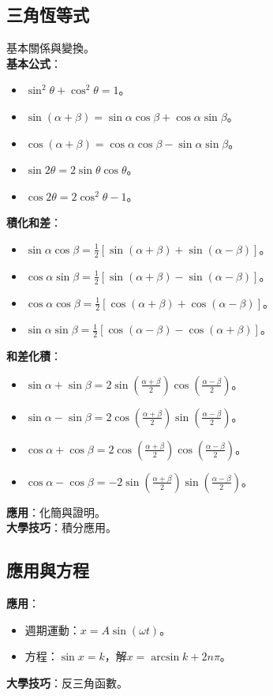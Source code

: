 \subsection{三角恆等式}
基本關係與變換。\\
\textbf{基本公式}：
\begin{itemize}
    \item $\sin^2 \theta + \cos^2 \theta = 1$。
    \item $\sin(\alpha + \beta) = \sin \alpha \cos \beta + \cos \alpha \sin \beta$。
    \item $\cos(\alpha + \beta) = \cos \alpha \cos \beta - \sin \alpha \sin \beta$。
    \item $\sin 2\theta = 2 \sin \theta \cos \theta$。
    \item $\cos 2\theta = 2\cos^2 \theta - 1$。
\end{itemize}
\textbf{積化和差}：
\begin{itemize}
    \item $\sin \alpha \cos \beta = \frac{1}{2} [\sin(\alpha + \beta) + \sin(\alpha - \beta)]$。
    \item $\cos \alpha \sin \beta = \frac{1}{2} [\sin(\alpha + \beta) - \sin(\alpha - \beta)]$。
    \item $\cos \alpha \cos \beta = \frac{1}{2} [\cos(\alpha + \beta) + \cos(\alpha - \beta)]$。
    \item $\sin \alpha \sin \beta = \frac{1}{2} [\cos(\alpha - \beta) - \cos(\alpha + \beta)]$。
\end{itemize}
\textbf{和差化積}：
\begin{itemize}
    \item $\sin \alpha + \sin \beta = 2 \sin\left(\frac{\alpha + \beta}{2}\right) \cos\left(\frac{\alpha - \beta}{2}\right)$。
    \item $\sin \alpha - \sin \beta = 2 \cos\left(\frac{\alpha + \beta}{2}\right) \sin\left(\frac{\alpha - \beta}{2}\right)$。
    \item $\cos \alpha + \cos \beta = 2 \cos\left(\frac{\alpha + \beta}{2}\right) \cos\left(\frac{\alpha - \beta}{2}\right)$。
    \item $\cos \alpha - \cos \beta = -2 \sin\left(\frac{\alpha + \beta}{2}\right) \sin\left(\frac{\alpha - \beta}{2}\right)$。
\end{itemize}
\textbf{應用}：化簡與證明。\\
\textbf{大學技巧}：積分應用。

\subsection{應用與方程}
\textbf{應用}：
\begin{itemize}
    \item 週期運動：$x = A \sin(\omega t)$。
    \item 方程：$\sin x = k$，解$x = \arcsin k + 2n\pi$。
\end{itemize}
\textbf{大學技巧}：反三角函數。

